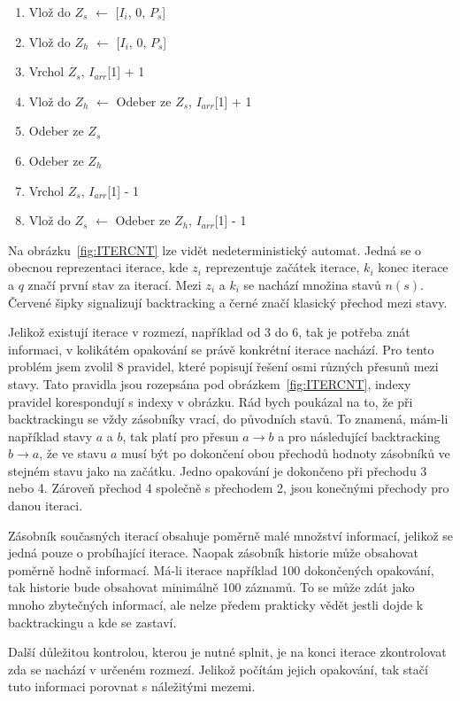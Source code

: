 \begin{enumerate}[label=\arabic* --]
	\item Vlož do $Z_s$ $\longleftarrow$ [$I_i$, 0, $P_s$]
	\item Vlož do $Z_h$ $\longleftarrow$ [$I_i$, 0, $P_s$]
	\item Vrchol $Z_s$, $I_{arr}$[1] + 1
	\item Vlož do $Z_h$ $\longleftarrow$ Odeber ze $Z_s$, $I_{arr}$[1] + 1
	\item Odeber ze $Z_s$
	\item Odeber ze $Z_h$
	\item Vrchol $Z_s$, $I_{arr}$[1] - 1
	\item Vlož do $Z_s$ $\longleftarrow$ Odeber ze $Z_h$, $I_{arr}$[1] - 1
\end{enumerate}

Na obrázku~\ref{fig:ITERCNT} lze vidět nedeterministický automat. 
Jedná se o obecnou reprezentaci iterace, kde $z_i$ reprezentuje začátek iterace, $k_i$ konec iterace a $q$ značí první stav za iterací.
Mezi $z_i$ a $k_i$ se nachází množina stavů $n(s)$.
Červené šipky signalizují backtracking a černé značí klasický přechod mezi stavy.

Jelikož existují iterace v rozmezí, například od 3 do 6, tak je potřeba znát informaci, v kolikátém opakování se právě konkrétní iterace nachází.
Pro tento problém jsem zvolil 8 pravidel, které popisují řešení osmi různých přesunů mezi stavy.
Tato pravidla jsou rozepsána pod obrázkem~\ref{fig:ITERCNT}, indexy pravidel korespondují s indexy v obrázku.
Rád bych poukázal na to, že při backtrackingu se vždy zásobníky vrací, do původních stavů. 
To znamená, mám-li například stavy $a$ a $b$, tak platí pro přesun $a \rightarrow b$ a pro následující backtracking $b \rightarrow a$, že ve stavu $a$ musí být po dokončení obou přechodů hodnoty zásobníků ve stejném stavu jako na začátku.
Jedno opakování je dokončeno při přechodu 3 nebo 4. 
Zároveň přechod 4 společně s přechodem 2, jsou konečnými přechody pro danou iteraci.

Zásobník současných iterací obsahuje poměrně malé množství informací, jelikož se jedná pouze o probíhající iterace.
Naopak zásobník historie může obsahovat poměrně hodně informací. 
Má-li iterace například 100 dokončených opakování, tak historie bude obsahovat minimálně 100 záznamů.
To se může zdát jako mnoho zbytečných informací, ale nelze předem prakticky vědět jestli dojde k backtrackingu a kde se zastaví.

Další důležitou kontrolou, kterou je nutné splnit, je na konci iterace zkontrolovat zda se nachází v určeném rozmezí.
Jelikož počítám jejich opakování, tak stačí tuto informaci porovnat s náležitými mezemi.

